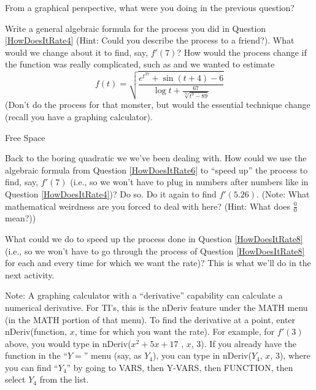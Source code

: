 \documentclass[handout]{ximera}
\begin{document}
\begin{question} 
From a graphical perspective, what were you doing in the previous question?
\end{question}

\begin{question}  \label{HowDoesItRate6}
Write a general algebraic formula for the process you did in Question \ref{HowDoesItRate4} (Hint:  Could you describe the process to a friend?).  What would we change about it to find, say, $f'(7)$?  How would the process change if the function was really complicated, such as   and we wanted to estimate 
\[
f(t) = \sqrt{\frac{e^{t^{37}}+\sin(t+4)-6}{\log t + \frac{67}{\sqrt[54]{t^9-89}}}}
\]
(Don't do the process for that monster, but would the essential technique change (recall you have a graphing calculator).
\end{question}
\begin{question}	
Free Space
\end{question}
\begin{question}\label{HowDoesItRate8}
Back to the boring quadratic we we've been dealing with.  How could we use the algebraic formula from Question \ref{HowDoesItRate6} to ``speed up'' the process to find, say, $f'(7)$ (i.e., so we won't have to plug in numbers after numbers like in Question \ref{HowDoesItRate4})?  Do so.  Do it again to find  $f'(5.26)$.  (Note: What mathematical weirdness are you forced to deal with here? (Hint:  What does $\frac{0}{0}$ mean?))
\end{question}
\begin{question}
What could we do to speed up the process done in Question \ref{HowDoesItRate8} (i.e., so we won't have to go through the process of Question \ref{HowDoesItRate8} for each and every time for which we want the rate)?  This is what we'll do in the next activity.
\end{question}

Note:  A graphing calculator with a ``derivative'' capability can calculate a numerical derivative.  For TI's, this is the nDeriv feature under the MATH menu (in the MATH portion of that menu).  To find the derivative at a point, enter nDeriv(function, $x$, time for which you want the rate).  For example, for $f'(3)$  above, you would type in nDeriv($x^2+5x+17$ , $x$, $3$).  If you already have the function in the ``$Y=$'' menu (say, as  $Y_4$), you can type in nDeriv($Y_4$, $x$, $3$), where you can find ``$Y_4$'' by going to VARS, then Y-VARS, then FUNCTION, then select $Y_4$  from the list.
\end{document}
